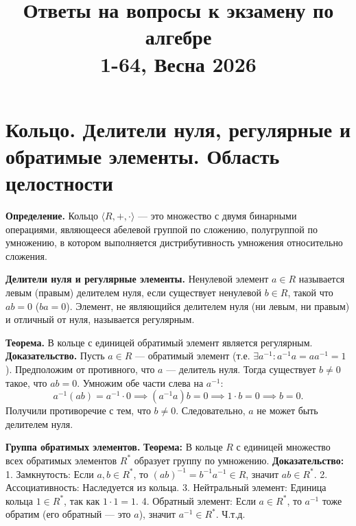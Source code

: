 \documentclass[12pt, a4paper]{article}
\title{\textbf{Ответы на вопросы к экзамену по алгебре}\\\large 1-64, Весна 2026}
\author{}
\date{}
\theoremstyle{definition}
\theoremstyle{remark}
\begin{document}
	\maketitle
	\tableofcontents
	\newpage

\section{Кольцо. Делители нуля, регулярные и обратимые элементы. Область целостности}


\textbf{Определение.} Кольцо $\langle R, +, \cdot \rangle$ — это множество с двумя бинарными операциями, являющееся абелевой группой по сложению, полугруппой по умножению, в котором выполняется дистрибутивность умножения относительно сложения.

\textbf{Делители нуля и регулярные элементы.} Ненулевой элемент $a \in R$ называется левым (правым) делителем нуля, если существует ненулевой $b \in R$, такой что $ab = 0$ ($ba = 0$). Элемент, не являющийся делителем нуля (ни левым, ни правым) и отличный от нуля, называется регулярным.

\textbf{Теорема.} В кольце с единицей обратимый элемент является регулярным.
\textbf{Доказательство.} Пусть $a \in R$ — обратимый элемент (т.е. $\exists a^{-1}: a^{-1}a = aa^{-1} = 1$). Предположим от противного, что $a$ — делитель нуля. Тогда существует $b \neq 0$ такое, что $ab = 0$. Умножим обе части слева на $a^{-1}$:
$$ a^{-1}(ab) = a^{-1} \cdot 0 \implies (a^{-1}a)b = 0 \implies 1 \cdot b = 0 \implies b = 0. $$
Получили противоречие с тем, что $b \neq 0$. Следовательно, $a$ не может быть делителем нуля.

\textbf{Группа обратимых элементов.} 
\textbf{Теорема:} В кольце $R$ с единицей множество всех обратимых элементов $R^*$ образует группу по умножению.
\textbf{Доказательство:}
1. Замкнутость: Если $a, b \in R^*$, то $(ab)^{-1} = b^{-1}a^{-1} \in R$, значит $ab \in R^*$.
2. Ассоциативность: Наследуется из кольца.
3. Нейтральный элемент: Единица кольца $1 \in R^*$, так как $1 \cdot 1 = 1$.
4. Обратный элемент: Если $a \in R^*$, то $a^{-1}$ тоже обратим (его обратный — это $a$), значит $a^{-1} \in R^*$. Ч.т.д.
\end{document}
